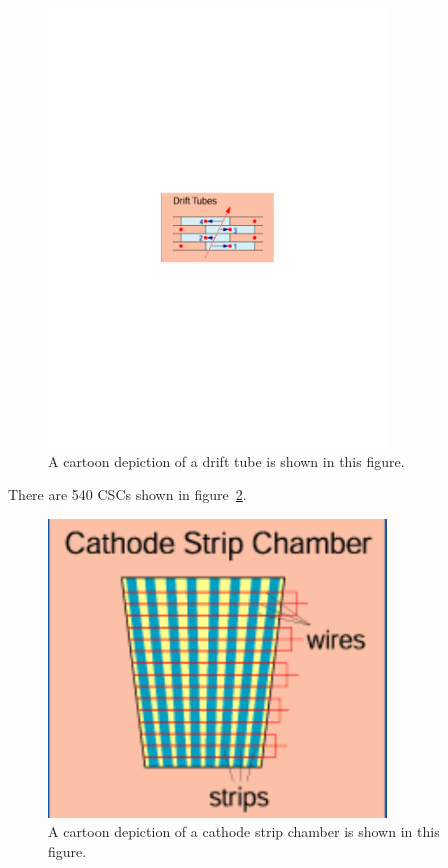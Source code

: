 \begin{figure}[!htb]
  \begin{center}
    \includegraphics[width=0.8\textwidth]{cms/figs/DT.pdf}
    \caption{
      \label{fig:DT}
      A cartoon depiction of a drift tube is shown in this figure. 
    }
  \end{center}
\end{figure}

There are 540 CSCs shown in figure~\ref{fig:CSC}.

\begin{figure}[!htb]
\begin{center}
\includegraphics[width=0.8\textwidth]{cms/figs/CSC.pdf}
\caption{ A cartoon depiction of a cathode strip chamber is shown in this figure. 
\label{fig:CSC}
}
\end{center}
\end{figure}

